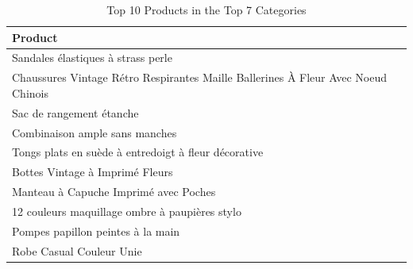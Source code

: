 \documentclass[a4paper,11pt]{article}
\begin{document}
\begin{table}[h!]
    \centering
    \caption{Top 10 Products in the Top 7 Categories}
    \begin{tabular}{|l|}
        \hline
        \textbf{Product} \\
        \hline
        Sandales élastiques à strass perle \\
        Chaussures Vintage Rétro Respirantes Maille Ballerines À Fleur Avec Noeud Chinois \\
        Sac de rangement étanche \\
        Combinaison ample sans manches \\
        Tongs plats en suède à entredoigt à fleur décorative \\
        Bottes Vintage à Imprimé Fleurs \\
        Manteau à Capuche Imprimé avec Poches \\
        12 couleurs maquillage ombre à paupières stylo \\
        Pompes papillon peintes à la main \\
        Robe Casual Couleur Unie \\
        \hline
    \end{tabular}
\end{table}

\newpage

\nocite{*}
\end{document}
